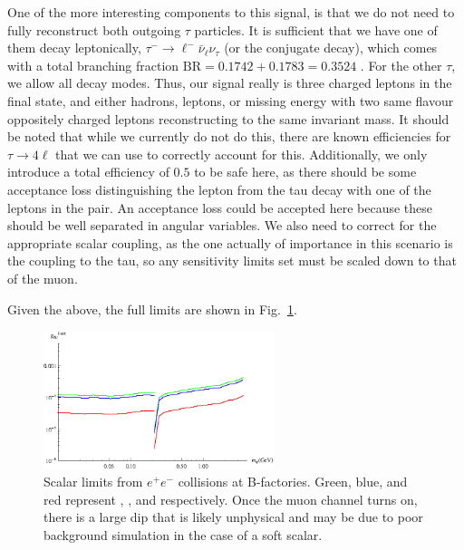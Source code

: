 One of the more interesting components to this signal, is that we do not need to fully reconstruct both outgoing $\tau$ particles.
It is sufficient that we have one of them decay leptonically, $\tau^- \rightarrow \ell^- \bar{\nu}_\ell \nu_\tau$ (or the conjugate decay), which comes with a total branching fraction $\textrm{BR} = 0.1742 + 0.1783 = 0.3524$ \cite{Agashe:2014kda}.
For the other $\tau$, we allow all decay modes.
Thus, our signal really is three charged leptons in the final state, and either hadrons, leptons, or missing energy with two same flavour oppositely charged leptons reconstructing to the same invariant mass.
It should be noted that while we currently do not do this, there are known efficiencies for $\tau \rightarrow 4\ell$ that we can use to correctly account for this.
Additionally, we only introduce a total efficiency of $0.5$ to be safe here, as there should be some acceptance loss distinguishing the lepton from the tau decay with one of the leptons in the pair.
An acceptance loss could be accepted here because these should be well separated in angular variables.
We also need to correct for the appropriate scalar coupling, as the one actually of importance in this scenario is the coupling to the tau, so any sensitivity limits set must be scaled down to that of the muon.

Given the above, the full limits are shown in Fig.\ \ref{fig:ee_limits}.

\begin{figure}[h]
    \centering
    \includegraphics[width=0.6\textwidth]{Figures/limits/ee_all}
    \caption{Scalar limits from $e^+ e^-$ collisions at B-factories. Green, blue, and red represent \babar, \belle, and \belletwo respectively. Once the muon channel turns on, there is a large dip that is likely unphysical and may be due to poor background simulation in the case of a soft scalar.}
    \label{fig:ee_limits}
\end{figure}
